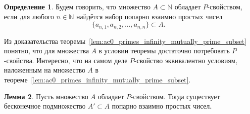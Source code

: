 \documentclass[a4paper,openbib]{article}
\theoremstyle{definition}
\newtheorem{lemma}{Лемма}[section]
\newtheorem{definition}[lemma]{Определение}
\begin{document}
\begin{definition}
	Будем говорить, что множество $A\subset\mathbb{N}$ обладает $P$-свойством,
	если для любого $n\in\mathbb{N}$ найдётся набор попарно взаимно простых чисел
	\begin{equation}
		\{a_{n,1}, a_{n,2}, ..., a_{n,n}  \} \subset A
		.
	\end{equation}
\end{definition}

Из доказательства теоремы~\ref{lem:ac0_primes_infinity_mutually_prime_subset} понятно,
что для множества $A$ в условии теоремы достаточно потребовать $P$-свойства.
Интересно, что на самом деле $P$-свойство эквивалентно условиям,
наложенным на множество $A$ в теореме~\ref{lem:ac0_primes_infinity_mutually_prime_subset}.

\begin{lemma}
	\label{lem:ac0_primes_infinity_mutually_prime_subset_equiv_to_P_property}
	Пусть множество $A$ обладает $P$-свойством.
	Тогда существует бесконечное подмножество $A'\subset A$ попарно взаимно простых чисел.
\end{lemma}
\end{document}
